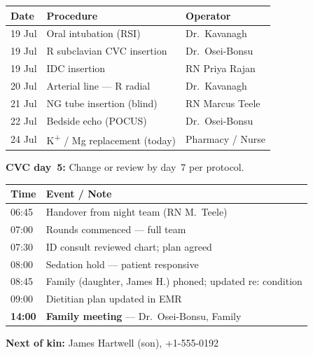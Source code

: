 \documentclass[11pt,a4paper]{scrartcl}
\begin{document}
\noindent
\begin{minipage}[t]{0.48\linewidth}
  \begin{tcolorbox}[notebox, title={\faSyringe\enspace Procedure Log}]
    \footnotesize\sffamily
    \renewcommand{\arraystretch}{1.2}
    \begin{tabularx}{\linewidth}{@{}lXl@{}}
      \textbf{Date} & \textbf{Procedure} & \textbf{Operator} \\
      \midrule
      19 Jul & Oral intubation (RSI) & Dr.\ Kavanagh \\
      19 Jul & R subclavian CVC insertion & Dr.\ Osei-Bonsu \\
      19 Jul & IDC insertion & RN Priya Rajan \\
      20 Jul & Arterial line — R radial & Dr.\ Kavanagh \\
      21 Jul & NG tube insertion (blind) & RN Marcus Teele \\
      22 Jul & Bedside echo (POCUS) & Dr.\ Osei-Bonsu \\
      24 Jul & K\textsuperscript{+} / Mg replacement (today) & Pharmacy / Nurse \\
    \end{tabularx}
    \vspace{4pt}
    \noindent\colorbox{MedGold!15!white}{\parbox{\linewidth-6pt}{%
      \textbf{\color{MedGold}CVC day~5:} Change or review by day~7 per protocol.
    }}
  \end{tcolorbox}
\end{minipage}%
\hfill
\begin{minipage}[t]{0.48\linewidth}
  \begin{tcolorbox}[notebox, title={\faComments\enspace Communication Log}]
    \footnotesize\sffamily
    \renewcommand{\arraystretch}{1.2}
    \begin{tabularx}{\linewidth}{@{}lX@{}}
      \textbf{Time} & \textbf{Event / Note} \\
      \midrule
      06:45 & Handover from night team (RN M.~Teele) \\
      07:00 & Rounds commenced — full team \\
      07:30 & ID consult reviewed chart; plan agreed \\
      08:00 & Sedation hold — patient responsive \\
      08:45 & Family (daughter, James H.) phoned; updated re: condition \\
      09:00 & Dietitian plan updated in EMR \\
      \textbf{14:00} & \textbf{Family meeting} — Dr.\ Osei-Bonsu, Family \\
    \end{tabularx}
    \vspace{4pt}
    \noindent\colorbox{MedLight}{\parbox{\linewidth-6pt}{%
      \textbf{\color{MedTeal}Next of kin:} James Hartwell (son),
      \textcolor{TextGray}{+1-555-0192}
    }}
  \end{tcolorbox}
\end{minipage}
\end{document}
